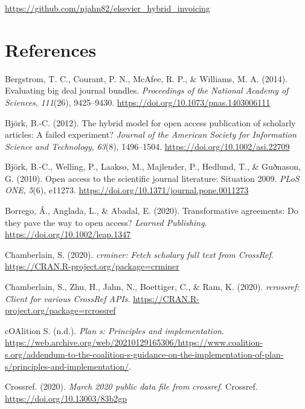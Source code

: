\documentclass[a4paper,man,floatsintext,longtable,noextraspace,12pt]{apa6}
\newenvironment{CSLReferences}%
  {}%
  {\par}
\begin{document}
\url{https://github.com/njahn82/elsevier_hybrid_invoicing}

\hypertarget{references}{%
\section*{References}\label{references}}

\hypertarget{refs}{}
\begin{CSLReferences}{1}{0}
\leavevmode\hypertarget{ref-Bergstrom_2014}{}%
Bergstrom, T. C., Courant, P. N., McAfee, R. P., \& Williams, M. A.
(2014). Evaluating big deal journal bundles. \emph{Proceedings of the
National Academy of Sciences}, \emph{111}(26), 9425--9430.
\url{https://doi.org/10.1073/pnas.1403006111}

\leavevmode\hypertarget{ref-Bj_rk_2012}{}%
Björk, B.-C. (2012). The hybrid model for open access publication of
scholarly articles: A failed experiment? \emph{Journal of the American
Society for Information Science and Technology}, \emph{63}(8),
1496--1504. \url{https://doi.org/10.1002/asi.22709}

\leavevmode\hypertarget{ref-Bj_rk_2010}{}%
Björk, B.-C., Welling, P., Laakso, M., Majlender, P., Hedlund, T., \&
Guðnason, G. (2010). Open access to the scientific journal literature:
Situation 2009. \emph{{PLoS} {ONE}}, \emph{5}(6), e11273.
\url{https://doi.org/10.1371/journal.pone.0011273}

\leavevmode\hypertarget{ref-Borrego_2020}{}%
Borrego, Á., Anglada, L., \& Abadal, E. (2020). Transformative
agreements: Do they pave the way to open access? \emph{Learned
Publishing}. \url{https://doi.org/10.1002/leap.1347}

\leavevmode\hypertarget{ref-crminer}{}%
Chamberlain, S. (2020). \emph{{crminer}: Fetch scholary full text from
{CrossRef}}. \url{https://CRAN.R-project.org/package=crminer}

\leavevmode\hypertarget{ref-rcrossref}{}%
Chamberlain, S., Zhu, H., Jahn, N., Boettiger, C., \& Ram, K. (2020).
\emph{{rcrossref}: Client for various {CrossRef} {APIs}}.
\url{https://CRAN.R-project.org/package=rcrossref}

\leavevmode\hypertarget{ref-Plan_s}{}%
cOAlition S. (n.d.). \emph{Plan s: Principles and implementation}.
\url{https://web.archive.org/web/20210129165306/https://www.coalition-s.org/addendum-to-the-coalition-s-guidance-on-the-implementation-of-plan-s/principles-and-implementation/}.

\leavevmode\hypertarget{ref-Crossref_2020}{}%
Crossref. (2020). \emph{March 2020 public data file from crossref}.
Crossref. \url{https://doi.org/10.13003/83b2gp}


\end{CSLReferences}
\end{document}
